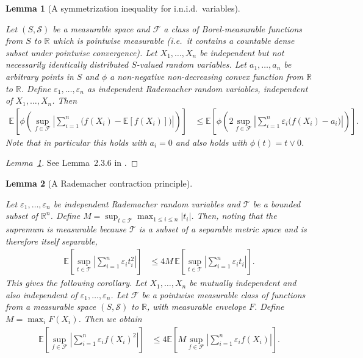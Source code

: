 \documentclass[11pt,lof]{puthesis}
\newcommand{\R}{\ensuremath{\mathbb{R}}}
\newcommand{\E}{\ensuremath{\mathbb{E}}}
\newcommand{\cF}{\ensuremath{\mathcal{F}}}
\newcommand{\cS}{\ensuremath{\mathcal{S}}}
\newcommand{\cT}{\ensuremath{\mathcal{T}}}
\theoremstyle{break}
\newtheorem{lemma}{Lemma}[section]
\theoremstyle{proof}
\newtheorem{proof}{Proof}
\begin{document}
\begin{lemma}[A symmetrization inequality for i.n.i.d.\ variables]
\label{lem:kernel_app_symmetrization}

Let $(S, \cS)$ be a measurable space and
$\cF$ a class of Borel-measurable functions
from $S$ to $\R$ which is pointwise measurable
(i.e.\ it contains a countable dense subset
under pointwise convergence).
Let $X_1, \ldots, X_n$
be independent
but not necessarily identically distributed
$S$-valued random variables.
Let $a_1, \ldots, a_n$ be arbitrary points in $S$
and $\phi$ a non-negative non-decreasing convex function
from $\R$ to $\R$.
Define $\varepsilon_1, \ldots, \varepsilon_n$
as independent Rademacher
random variables,
independent of $X_1, \ldots, X_n$.
Then
%
\begin{align*}
\E \left[
\phi \left(
\sup_{f \in \cF}
\left|
\sum_{i=1}^n
\Big(
f(X_i)
- \E[f(X_i)]
\Big)
\right|
\right)
\right]
&\leq
\E \left[
\phi \left(
2
\sup_{f \in \cF}
\left|
\sum_{i=1}^n
\varepsilon_i
\Big(
f(X_i)
- a_i
\Big)
\right|
\right)
\right].
\end{align*}
%
Note that in particular this holds with $a_i = 0$
and also holds with $\phi(t) = t \vee 0$.

\end{lemma}

\begin{proof}[Lemma~\ref{lem:kernel_app_symmetrization}]

See Lemma~2.3.6 in
\citet{van1996weak}.
%
\end{proof}

\begin{lemma}[A Rademacher contraction principle]
\label{lem:kernel_app_contraction}

Let $\varepsilon_1, \ldots, \varepsilon_n$
be independent Rademacher random variables
and $\cT$ be a bounded subset of $\R^n$.
Define
$M = \sup_{t \in \cT} \max_{1 \leq i \leq n} |t_i|$.
Then, noting that the supremum is measurable
because $\cT$ is a subset of a separable metric space
and is therefore itself separable,
%
\begin{align*}
\E
\left[
\sup_{t \in \cT}
\left|
\sum_{i=1}^n
\varepsilon_i
t_i^2
\right|
\right]
&\leq
4M \,
\E
\left[
\sup_{t \in \cT}
\left|
\sum_{i=1}^n
\varepsilon_i
t_i
\right|
\right].
\end{align*}
%
This gives the following corollary.
Let $X_1, \ldots, X_n$ be mutually independent
and also independent of $\varepsilon_1, \ldots, \varepsilon_n$.
Let $\cF$ be a pointwise measurable class of functions
from a measurable space $(S, \cS)$ to $\R$,
with measurable envelope $F$.
Define $M = \max_i F(X_i)$.
Then we obtain
%
\begin{align*}
\E
\left[
\sup_{f \in \cF}
\left|
\sum_{i=1}^n
\varepsilon_i
f(X_i)^2
\right|
\right]
&\leq
4
\E
\left[
M
\sup_{f \in \cF}
\left|
\sum_{i=1}^n
\varepsilon_i
f(X_i)
\right|
\right].
\end{align*}

\end{lemma}
\end{document}
